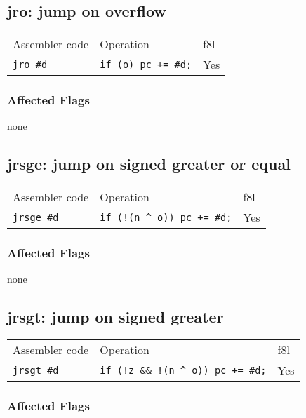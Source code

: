 \documentclass{book}
\begin{document}
\subsection{jro: jump on overflow}

\begin{tabular}{l l l}
Assembler code   & Operation                  & f8l \\
\texttt{jro \#d} & \texttt{if (o) pc += \#d;} & Yes \\
\end{tabular}

\subsubsection*{Affected Flags}

none


\subsection{jrsge: jump on signed greater or equal}

\begin{tabular}{l l l}
Assembler code     & Operation                            & f8l \\
\texttt{jrsge \#d} & \texttt{if (!(n \^{} o)) pc += \#d;} & Yes \\
\end{tabular}

\subsubsection*{Affected Flags}

none


\subsection{jrsgt: jump on signed greater}

\begin{tabular}{l l l}
Assembler code     & Operation                                    & f8l \\
\texttt{jrsgt \#d} & \texttt{if (!z \&\& !(n \^{} o)) pc += \#d;} & Yes \\
\end{tabular}

\subsubsection*{Affected Flags}
\end{document}
